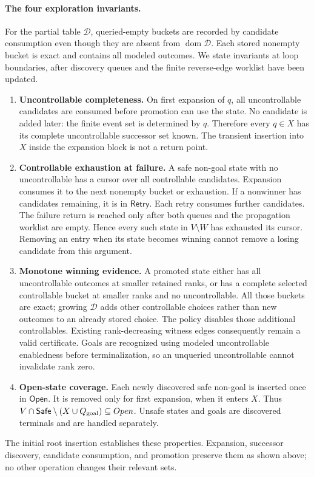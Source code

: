 \paragraph{The four exploration invariants.}\label{ta:search-invariants}
For the partial table $\mathcal D$, queried-empty buckets are recorded by candidate consumption even though they are absent from $\operatorname{dom}\mathcal D$. Each stored nonempty bucket is exact and contains all modeled outcomes. We state invariants at loop boundaries, after discovery queues and the finite reverse-edge worklist have been updated.
\begin{enumerate}
\item \textbf{Uncontrollable completeness.} On first expansion of $q$, all uncontrollable candidates are consumed before promotion can use the state. No candidate is added later: the finite event set is determined by $q$. Therefore every $q\in X$ has its complete uncontrollable successor set known. The transient insertion into $X$ inside the expansion block is not a return point.
\item \textbf{Controllable exhaustion at failure.} A safe non-goal state with no uncontrollable has a cursor over all controllable candidates. Expansion consumes it to the next nonempty bucket or exhaustion. If a nonwinner has candidates remaining, it is in $\mathsf{Retry}$. Each retry consumes further candidates. The failure return is reached only after both queues and the propagation worklist are empty. Hence every such state in $V\setminus W$ has exhausted its cursor. Removing an entry when its state becomes winning cannot remove a losing candidate from this argument.
\item \textbf{Monotone winning evidence.} A promoted state either has all uncontrollable outcomes at smaller retained ranks, or has a complete selected controllable bucket at smaller ranks and no uncontrollable. All those buckets are exact; growing $\mathcal D$ adds other controllable choices rather than new outcomes to an already stored choice. The policy disables those additional controllables. Existing rank-decreasing witness edges consequently remain a valid certificate. Goals are recognized using modeled uncontrollable enabledness before terminalization, so an unqueried uncontrollable cannot invalidate rank zero.
\item \textbf{Open-state coverage.} Each newly discovered safe non-goal is inserted once in $\mathsf{Open}$. It is removed only for first expansion, when it enters $X$. Thus $V\cap\mathsf{Safe}\setminus(X\cup Q_{\mathrm{goal}})\subseteq Open$. Unsafe states and goals are discovered terminals and are handled separately.
\end{enumerate}
The initial root insertion establishes these properties. Expansion, successor discovery, candidate consumption, and promotion preserve them as shown above; no other operation changes their relevant sets.

